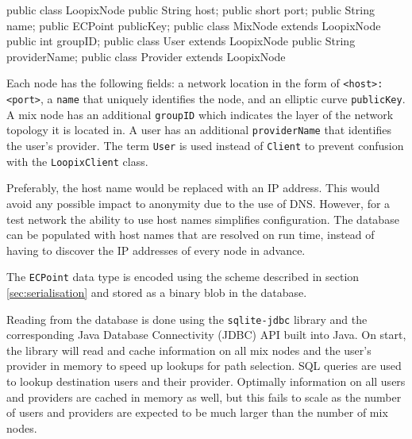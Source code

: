 \documentclass[final,dissertation.tex]{subfiles}
\begin{document}
\begin{javacode}
public class LoopixNode {
    public String host;
    public short port;
    public String name;
    public ECPoint publicKey;
}
public class MixNode extends LoopixNode {
	public int groupID;
}
public class User extends LoopixNode {
    public String providerName;
}
public class Provider extends LoopixNode { }
\end{javacode}

Each node has the following fields: a network location in the form of \verb|<host>:<port>|, a \verb|name| that uniquely identifies the node, and an elliptic curve \verb|publicKey|. A mix node has an additional \verb|groupID| which indicates the layer of the network topology it is located in. A user has an additional \verb|providerName| that identifies the user's provider. The term \verb|User| is used instead of \verb|Client| to prevent confusion with the \verb|LoopixClient| class.

Preferably, the host name would be replaced with an IP address. This would avoid any possible impact to anonymity due to the use of DNS. However, for a test network the ability to use host names simplifies configuration. The database can be populated with host names that are resolved on run time, instead of having to discover the IP addresses of every node in advance.


The \verb|ECPoint| data type is encoded using the scheme described in section \ref{sec:serialisation} and stored as a binary blob in the database.

Reading from the database is done using the \verb|sqlite-jdbc| library and the corresponding Java Database Connectivity (JDBC)
API built into Java. On start, the library will read and cache information on all mix nodes and the user's provider in memory to speed up lookups for path selection. SQL queries are used to lookup destination users and their provider. Optimally information on all users and providers are cached in memory as well, but this fails to scale as the number of users and providers are expected to be much larger than the number of mix nodes.
\end{document}
